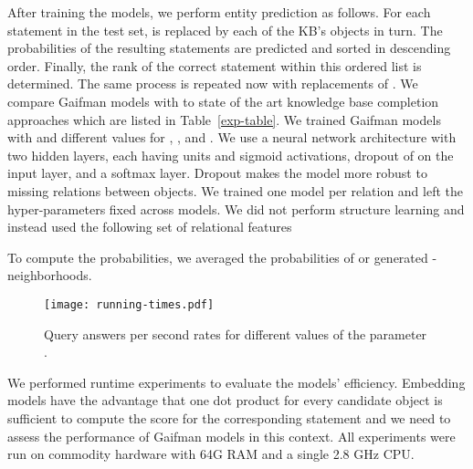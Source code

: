 \documentclass{article}
\begin{document}
After training the models, we perform entity prediction as follows. For each statement  in the test set,  is replaced by each of the KB's objects in turn. The probabilities of the resulting statements are predicted and sorted in descending order. Finally, the rank of the correct statement within this ordered list is determined. The same process is repeated now with replacements of . 
We compare Gaifman models with  to state of the art knowledge base completion approaches which are listed in Table~\ref{exp-table}.  We trained Gaifman models with  and different values for , , and . We use a neural network architecture with two hidden layers, each having  units and sigmoid activations, dropout of  on the input layer, and a softmax layer. Dropout makes the model more robust to missing relations between objects. We trained one model per relation and left the hyper-parameters fixed across models. We did not perform structure learning and instead used the following set of relational features


To compute the probabilities, we averaged the probabilities of  or  generated -neighborhoods. 

\begin{wrapfigure}[15]{r}{6.6cm}
\vspace{-6mm}
\texttt{[image: running-times.pdf]}\caption{\label{fig-runtimes} Query answers per second rates for different values of the parameter .}
\end{wrapfigure}


We performed runtime experiments to evaluate the models' efficiency. Embedding models have the advantage that one dot product for every candidate object is sufficient to compute the score for the corresponding statement and we need to assess the performance of Gaifman models in this context. All experiments were run on commodity hardware with 64G RAM and a single 2.8 GHz CPU.
\end{document}
